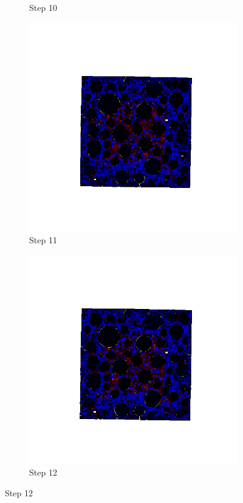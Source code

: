 \begin{figure}[ht!]
\begin{subfigure}{.25\textwidth}
      \caption{Step 10}
      \end{subfigure}%
      \begin{subfigure}{.25\textwidth}
        \centering
        \includegraphics[width=1.0\linewidth]{Files/A30X0C_3_IS/DEP50-STEP(011).png}
      \caption{Step 11}
      \end{subfigure}%
      \begin{subfigure}{.25\textwidth}
        \centering
        \includegraphics[width=1.0\linewidth]{Files/A30X0C_3_IS/DEP50-STEP(012).png}
      \caption{Step 12}
      \end{subfigure}


\end{figure}
